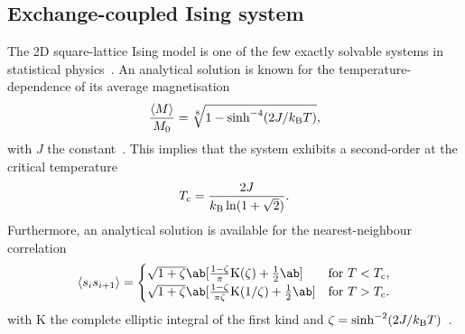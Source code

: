 
\subsection{Exchange-coupled Ising system}\label{sec:2:Verification_OOP_Exchange}
The 2D square-lattice  Ising model is one of the few exactly solvable systems in statistical physics~\cite{ExactlySolvedModelsStatMech}.
An analytical solution is known for the temperature-dependence of its average magnetisation
\begin{equation}
	\label{eq:2:Verification_exchange_M}
	\frac{\langle M \rangle}{M_0} = \sqrt[8]{1 - \sinh^{-4}(2J/\kBT)} \mathrm{,}
\end{equation}
with $J$ the  constant~\cite{Correlations2DIsing,IsingSpontaneousMagnetization,coey2010magnetism}.
This implies that the system exhibits a second-order  at the critical temperature~\cite{ExactlySolvedModelsStatMech}
\begin{equation}
	T_\mathrm{c} = \frac{2J}{\kB \ln(1 + \sqrt{2})} \mathrm{.}
\end{equation}
Furthermore, an analytical solution is available for the nearest-neighbour correlation
\begin{equation}
	\label{eq:2:Verification_exchange_corr}
	\langle s_i s_{i+1} \rangle = 
	\begin{cases}
		\sqrt{1+\zeta} \ab[\frac{1-\zeta}{\pi}\mathrm{K}(\zeta) + \frac{1}{2} \ab] &\text{for } T < T_\mathrm{c} \mathrm{,} \\ 
		\sqrt{1+\zeta} \ab[\frac{1-\zeta}{\pi \zeta}\mathrm{K}(1/\zeta) + \frac{1}{2} \ab] &\text{for } T > T_\mathrm{c} \mathrm{.} \\ 
	\end{cases}
\end{equation}
with $\mathrm{K}$ the complete elliptic integral of the first kind and $\zeta=\sinh^{-2}(2J/\kBT)$~\cite{Correlations2DIsing}. \\\par

